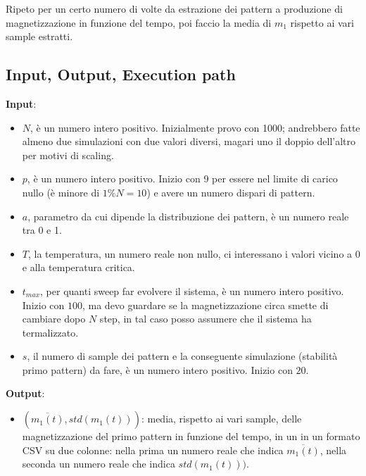 \documentclass[a4paper,10pt]{article}
\begin{document}
Ripeto per un certo numero di volte da estrazione dei pattern a produzione di magnetizzazione in funzione del tempo, poi faccio la media di $m_1$ rispetto ai vari sample estratti.

\subsection{Input, Output, Execution path}

\textbf{Input}: \begin{itemize}
\item $N$, è un numero intero positivo. Inizialmente provo con 1000; andrebbero fatte almeno due simulazioni con due valori diversi, magari uno il doppio dell'altro per motivi di scaling.
\item $p$, è un numero intero positivo. Inizio con 9 per essere nel limite di carico nullo (è minore di $1\%N=10$) e avere un numero dispari di pattern.
\item $a$, parametro da cui dipende la distribuzione dei pattern, è un numero reale tra 0 e 1.
\item $T$, la temperatura, un numero reale non nullo, ci interessano i valori vicino a 0 e alla temperatura critica.
\item $t_{max}$, per quanti sweep far evolvere il sistema, è un numero intero positivo. Inizio con $100$, ma devo guardare se la magnetizzazione circa smette di cambiare dopo $N$ step, in tal caso posso assumere che il sistema ha termalizzato.
\item $s$, il numero di sample dei pattern e la conseguente simulazione (stabilità primo pattern) da fare, è un numero intero positivo. Inizio con $20$.                                                                                                                                                                                                                                             \end{itemize}


\textbf{Output}:
\begin{itemize}
 \item $(\overline{m_1(t)}, std(m_1(t)))$: media, rispetto ai vari sample, delle magnetizzazione del primo pattern in funzione del tempo, in un in un formato CSV su due colonne: nella prima un numero reale che indica $\overline{m_1(t)}$, nella seconda un numero reale che indica $std(m_1(t)))$.
\end{itemize}
\end{document}
